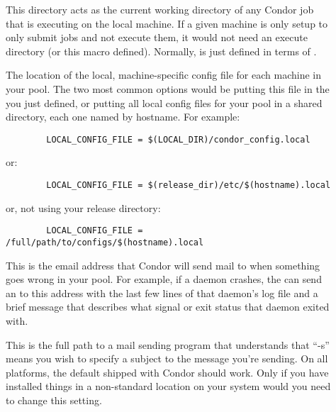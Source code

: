 \begin{description}
\item[] \label{param:Execute} This directory acts as
  the current working directory of any Condor job that is executing on
  the local machine.  If a given machine is only setup to only submit
  jobs and not execute them, it would not need an execute directory
  (or this macro defined).  Normally,  is just defined
  in terms of .
  
\item[] \label{param:LocalConfigFile} The
  location of the local, machine-specific config file for each machine
  in your pool.  The two most common options would be putting this
  file in the  you just defined, or putting all
  local config files for your pool in a shared directory, each one
  named by hostname.  For example:

\begin{verbatim}
        LOCAL_CONFIG_FILE = $(LOCAL_DIR)/condor_config.local
\end{verbatim}
  
  or:

\begin{verbatim}
        LOCAL_CONFIG_FILE = $(release_dir)/etc/$(hostname).local
\end{verbatim}
  
  or, not using your release directory:

\begin{verbatim}
        LOCAL_CONFIG_FILE = /full/path/to/configs/$(hostname).local
\end{verbatim}
  
\item[] \label{param:CondorAdmin} This is the email
  address that Condor will send mail to when something goes wrong in
  your pool.  For example, if a daemon crashes, the 
  can send an  to this address with the last few lines
  of that daemon's log file and a brief message that describes what
  signal or exit status that daemon exited with.
  
\item[] \label{param:Mail} This is the full path to a mail
  sending program that understands that ``-s'' means you wish to
  specify a subject to the message you're sending.  On all platforms,
  the default shipped with Condor should work.  Only if you have
  installed things in a non-standard location on your system would you
  need to change this setting.
  

\end{description}
